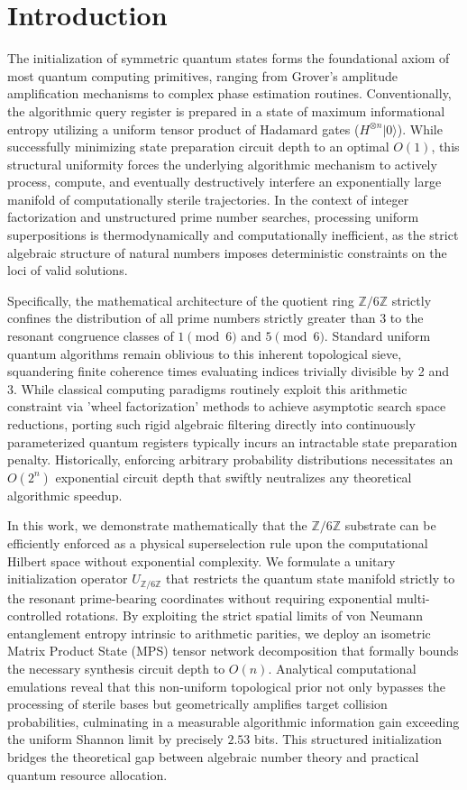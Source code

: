 \documentclass[pdflatex,sn-nature]{sn-jnl}
\theoremstyle{thmstyleone}
\theoremstyle{thmstyletwo}
\theoremstyle{thmstylethree}
\begin{document}
\section*{Introduction}
The initialization of symmetric quantum states forms the foundational axiom of most quantum computing primitives, ranging from Grover's amplitude amplification mechanisms to complex phase estimation routines. Conventionally, the algorithmic query register is prepared in a state of maximum informational entropy utilizing a uniform tensor product of Hadamard gates ($H^{\otimes n}|0\rangle$). While successfully minimizing state preparation circuit depth to an optimal $O(1)$, this structural uniformity forces the underlying algorithmic mechanism to actively process, compute, and eventually destructively interfere an exponentially large manifold of computationally sterile trajectories. In the context of integer factorization and unstructured prime number searches, processing uniform superpositions is thermodynamically and computationally inefficient, as the strict algebraic structure of natural numbers imposes deterministic constraints on the loci of valid solutions.

Specifically, the mathematical architecture of the quotient ring $\mathbb{Z}/6\mathbb{Z}$ strictly confines the distribution of all prime numbers strictly greater than 3 to the resonant congruence classes of $1 \pmod 6$ and $5 \pmod 6$. Standard uniform quantum algorithms remain oblivious to this inherent topological sieve, squandering finite coherence times evaluating indices trivially divisible by 2 and 3. While classical computing paradigms routinely exploit this arithmetic constraint via 'wheel factorization' methods to achieve asymptotic search space reductions, porting such rigid algebraic filtering directly into continuously parameterized quantum registers typically incurs an intractable state preparation penalty. Historically, enforcing arbitrary probability distributions necessitates an $O(2^n)$ exponential circuit depth that swiftly neutralizes any theoretical algorithmic speedup. 

In this work, we demonstrate mathematically that the $\mathbb{Z}/6\mathbb{Z}$ substrate can be efficiently enforced as a physical superselection rule upon the computational Hilbert space without exponential complexity. We formulate a unitary initialization operator $U_{\mathbb{Z}/6\mathbb{Z}}$ that restricts the quantum state manifold strictly to the resonant prime-bearing coordinates without requiring exponential multi-controlled rotations. By exploiting the strict spatial limits of von Neumann entanglement entropy intrinsic to arithmetic parities, we deploy an isometric Matrix Product State (MPS) tensor network decomposition that formally bounds the necessary synthesis circuit depth to $O(n)$. Analytical computational emulations reveal that this non-uniform topological prior not only bypasses the processing of sterile bases but geometrically amplifies target collision probabilities, culminating in a measurable algorithmic information gain exceeding the uniform Shannon limit by precisely $2.53$ bits. This structured initialization bridges the theoretical gap between algebraic number theory and practical quantum resource allocation.
\end{document}
